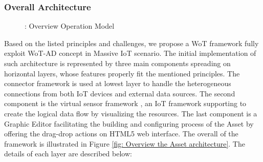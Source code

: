 \subsubsection{Overall Architecture}
\begin{figure}[h]
	\centering
	\caption{ : Overview Operation Model}
	\label{fig: Overview Operation Model}
\end{figure}
Based on the listed principles and challenges, we propose a WoT framework fully exploit WoT-AD concept in Massive IoT scenario. The initial implementation of such architecture is represented by three main components spreading on horizontal layers, whose features properly fit the mentioned principles. The connector framework is used at lowest layer \cite{kim2017industrial} to handle the heterogeneous connections from both IoT devices and external data sources. The second component is the virtual sensor framework \cite{kim2017scalable}, an IoT framework supporting to create the logical data flow by visualizing the resources. The last component is a Graphic Editor facilitating the building and configuring process of the Asset by offering the drag-drop actions on HTML5 web interface. The overall of the framework is illustrated in Figure \ref{fig: Overview the Asset architecture}. The details of each layer are described below:
